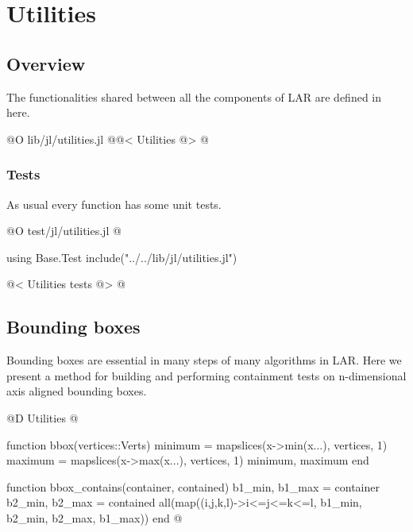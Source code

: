 \chapter{Utilities}
\label{ch:utilities}

\section{Overview}

The functionalities shared between all the components of LAR
are defined in here.

@O lib/jl/utilities.jl
@{@< Utilities @>
@}

\subsection{Tests}
As usual every function has some unit tests.

@O test/jl/utilities.jl
@{using Base.Test
include("../../lib/jl/utilities.jl")

@< Utilities tests @>
@}


\section{Bounding boxes}
\label{sec:bboxes}

Bounding boxes are essential in many steps of many
algorithms in LAR. Here we present a method for building
and performing containment tests on n-dimensional 
axis aligned bounding boxes.

@D Utilities
@{function bbox(vertices::Verts)
    minimum = mapslices(x->min(x...), vertices, 1)
    maximum = mapslices(x->max(x...), vertices, 1)
    minimum, maximum
end

function bbox_contains(container, contained)
    b1_min, b1_max = container
    b2_min, b2_max = contained
    all(map((i,j,k,l)->i<=j<=k<=l, b1_min, b2_min, b2_max, b1_max))
end
@}

